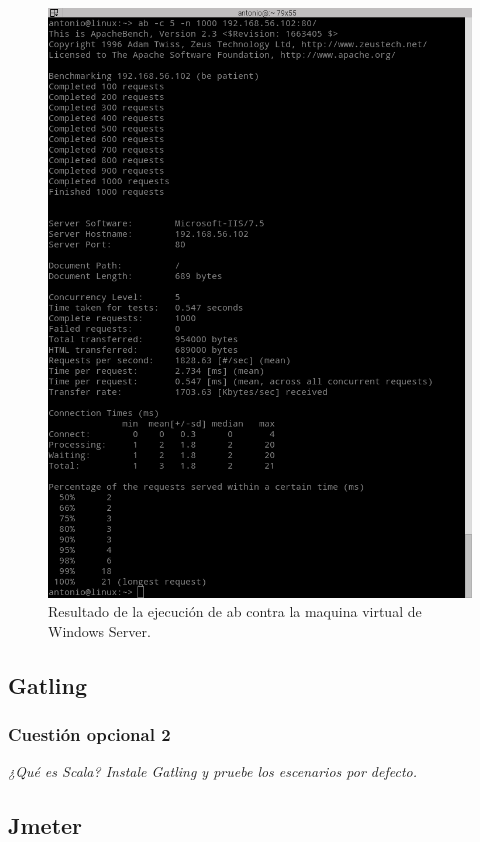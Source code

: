 \begin{figure}[H]
  \begin{center}
    \includegraphics[width=1\textwidth]{imagenes/abwin}
    \caption{Resultado de la ejecución de ab contra la maquina virtual de Windows Server.}
    \label{fig5}
  \end{center}
\end{figure}

\subsection{Gatling}
\subsubsection{Cuestión opcional 2}
\textit{¿Qué es Scala? Instale Gatling y pruebe los escenarios por defecto.}

\subsection{Jmeter}
